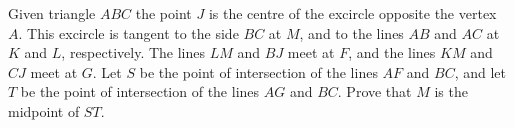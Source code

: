 Given triangle 
$ABC$
 the point 
$J$
 is the centre of the excircle opposite the vertex 
$A.$
 This excircle is tangent to the side 
$BC$
 at 
$M$, 
 and to the lines 
$AB$
 and 
$AC$
 at 
$K$
 and 
$L$, 
 respectively. The lines 
$LM$
 and 
$BJ$
 meet at 
$F$, 
 and the lines 
$KM$
 and 
$CJ$
 meet at 
$G.$
 Let 
$S$
 be the point of intersection of the lines 
$AF$
 and 
$BC$, 
 and let 
$T$
 be the point of intersection of the lines 
$AG$
 and 
$BC.$
 Prove that 
$M$
 is the midpoint of 
$ST.$

